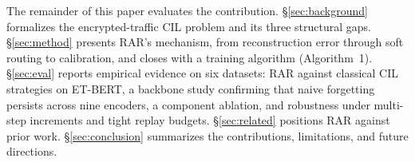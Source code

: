 The remainder of this paper evaluates the contribution. \S\ref{sec:background} formalizes the encrypted-traffic CIL problem and its three structural gaps. \S\ref{sec:method} presents RAR's mechanism, from reconstruction error through soft routing to calibration, and closes with a training algorithm (Algorithm~1). \S\ref{sec:eval} reports empirical evidence on six datasets: RAR against classical CIL strategies on ET-BERT, a backbone study confirming that naive forgetting persists across nine encoders, a component ablation, and robustness under multi-step increments and tight replay budgets. \S\ref{sec:related} positions RAR against prior work. \S\ref{sec:conclusion} summarizes the contributions, limitations, and future directions.
